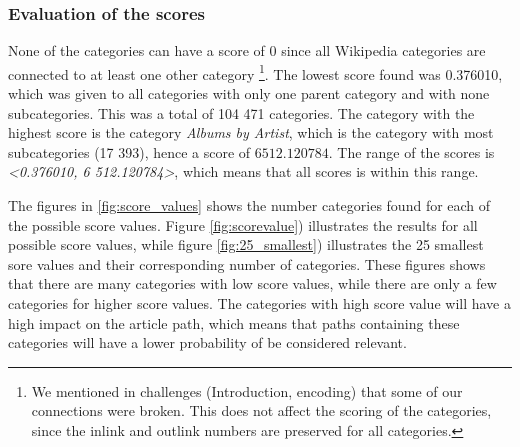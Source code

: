 
\subsubsection{Evaluation of the scores}
None of the categories can have a score of 0 since all Wikipedia categories are connected to at least one other category \footnote{We mentioned in challenges (Introduction, encoding) that some of our connections were broken. This does not affect the scoring of the categories, since the inlink and outlink numbers are preserved for all categories. }. The lowest score found was 0.376010, which was given to all categories with only one parent category and with none subcategories. This was a total of 104 471 categories.  The category with the highest score is the category \emph{Albums by Artist}, which is the category with most subcategories (17 393), hence a score of $6 512.120784$. The range of the scores is \emph{<0.376010, 6 512.120784>}, which means that all scores is within this range. 

The figures in \ref{fig:score_values} shows the number categories found for each of the possible score values. Figure \ref{fig:scorevalue}) illustrates the results for all possible score values, while figure \ref{fig:25_smallest}) illustrates the  25 smallest sore values and their corresponding number of categories. These figures shows that there are many categories with low score values, while there are only a few categories for higher score values. The categories with high score value will have a high impact on the article path, which means that paths containing these categories will have a lower probability of be considered relevant. 


